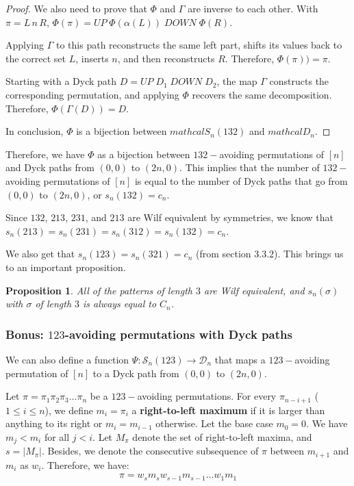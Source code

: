 \documentclass[12pt]{article}
\newtheorem{prop}{Proposition}   %
\begin{document}
\begin{proof}
We also need to prove that $\Phi$ and $\Gamma$ are inverse to each other. With $\pi=L\,n\,R$, $\Phi(\pi)=UP\;\Phi(\alpha(L))\;DOWN\;\Phi(R).$

Applying $\Gamma$ to this path reconstructs the same left part, shifts its values back to
the correct set $L$, inserts $n$, and then reconstructs $R$. Therefore, $\Phi(\pi))=\pi$.

Starting with a Dyck path $D=UP\;D_1\;DOWN\;D_2$, the map $\Gamma$ constructs the corresponding permutation, and applying $\Phi$ recovers
the same decomposition. Therefore, $\Phi(\Gamma(D))=D$.

In conclusion, $\Phi$ is a bijection between $mathcal{S}_n(132)$ and $mathcal{D}_n$. 
\end{proof}

Therefore, we have $\Phi$ as a bijection between $132-$avoiding permutations of $[n]$ and Dyck paths from $(0,0)$ to $(2n,0)$. This implies that the number of $132-$avoiding permutations of $[n]$ is equal to the number of Dyck paths that go from $(0,0)$ to $(2n,0)$, or $s_n(132)=c_n$.

Since $132$, $213$, $231$, and $213$ are Wilf equivalent by symmetries, we know that $s_n(213)=s_n(231)=s_n(312)=s_n(132)=c_n$. 

We also get that $s_n(123)= s_n(321) = c_n$ (from section $3.3.2$). This brings us to an important proposition.

\begin{prop}
    All of the patterns of length $3$ are Wilf equivalent, and $s_n(\sigma)$ with $\sigma$ of length $3$ is always equal to $C_n$.
\end{prop}

\subsubsection{Bonus: $123$-avoiding permutations with Dyck paths}
We can also define a function $\Psi: \mathcal{S}_n(123) \rightarrow \mathcal{D}_n$ that maps a $123-$avoiding permutation of $[n]$ to a Dyck path from $(0,0)$ to $(2n,0)$.

Let $\pi = \pi_1\pi_2\pi_3\ldots\pi_n$ be a $123-$avoiding permutations. For every $\pi_{n-i+1}$ ($1 \leq i \leq n$), we define $m_i = \pi_i$ a \textbf{right-to-left maximum} if it is larger than anything to its right or $m_i = m_{i-1}$ otherwise. Let the base case $m_0=0$. We have $m_j < m_i$ for all $j<i$.
Let $M_\pi$ denote the set of right-to-left maxima, and $s = |M_\pi|$. Besides, we denote the consecutive subsequence of $\pi$ between $m_{i+1}$ and $m_i$ as $w_i$. Therefore, we have:
\begin{align}
\pi = w_sm_sw_{s-1}m_{s-1}\ldots w_1m_1
\end{align}
\end{document}
